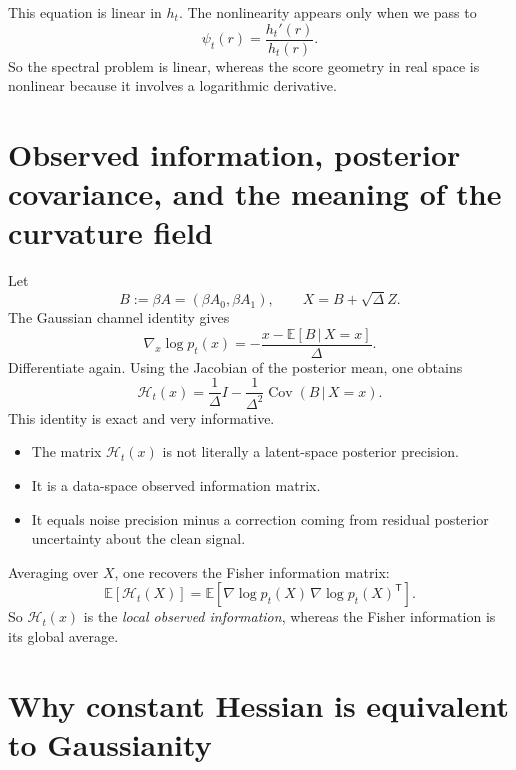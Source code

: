 \documentclass[11pt]{article}
\newcommand{\E}{\mathbb{E}}
\newcommand{\Cov}{\operatorname{Cov}}
\newcommand{\1}{\mathbf{1}}
\newcommand{\trans}{^{\mathsf T}}
\newcommand{\pt}{p_t}
\newcommand{\curv}{\mathcal{H}}
\newcommand{\given}{\,|\,}
\newcommand{\sq}[1]{\left[#1\right]}
\theoremstyle{definition}
\begin{document}
This equation is linear in \(h_t\). The nonlinearity appears only when we pass to
\begin{equation}
\psi_t(r)=\frac{h_t'(r)}{h_t(r)}.
\end{equation}
So the spectral problem is linear, whereas the score geometry in real space is nonlinear because it involves a logarithmic derivative.

\section{Observed information, posterior covariance, and the meaning of the curvature field}

Let
\begin{equation}
B := \beta A = (\beta A_0,\beta A_1),
\qquad
X = B + \sqrt{\Delta}Z.
\end{equation}
The Gaussian channel identity gives
\begin{equation}
\label{eq:tweedie-score}
\nabla_x \log \pt(x)= -\frac{x-\E[B\given X=x]}{\Delta}.
\end{equation}
Differentiate again. Using the Jacobian of the posterior mean, one obtains
\begin{equation}
\label{eq:observed-information-identity}
\boxed{
\curv_t(x)=\frac{1}{\Delta}I - \frac{1}{\Delta^2}\Cov(B\given X=x).
}
\end{equation}
This identity is exact and very informative.

\begin{itemize}[leftmargin=2em]
    \item The matrix \(\curv_t(x)\) is not literally a latent-space posterior precision.
    \item It is a data-space observed information matrix.
    \item It equals noise precision minus a correction coming from residual posterior uncertainty about the clean signal.
\end{itemize}

Averaging over \(X\), one recovers the Fisher information matrix:
\begin{equation}
\label{eq:fisher-average}
\E\sq{\curv_t(X)} = \E\sq{\nabla\log \pt(X)\, \nabla\log \pt(X)\trans}.
\end{equation}
So \(\curv_t(x)\) is the \emph{local observed information}, whereas the Fisher information is its global average.

\section{Why constant Hessian is equivalent to Gaussianity}
\end{document}
